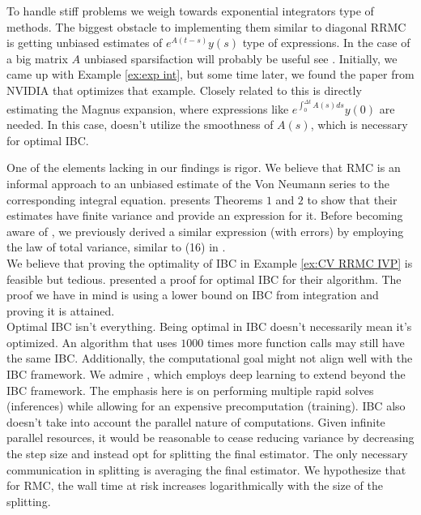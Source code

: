 \documentclass[a4paper,12pt]{article}
\begin{document}
To handle stiff problems we weigh towards exponential integrators
type of methods. The biggest obstacle to implementing them similar to diagonal RRMC
is getting unbiased estimates of $e^{A(t-s)} y(s)$ type of expressions. In the case
of a big matrix $A$  unbiased sparsifaction will probably be useful
see \cite{sabelfeld_sparsified_2009}.
Initially, we came up with Example \ref{ex:exp int}, but some time later,
we found the paper from NVIDIA \cite{kettunen_unbiased_2021} that optimizes
that example. Closely related to this is directly estimating the Magnus expansion,
where expressions like $e^{\int_{0}^{\Delta t} A(s)ds} y(0)$ are needed.
In this case, \cite{kettunen_unbiased_2021} doesn't utilize the smoothness of
$A(s)$, which is necessary
for optimal IBC.

One of the elements lacking in our findings is rigor.  We believe
that RMC is an informal approach to an unbiased estimate of
the Von Neumann series to the corresponding integral equation.
\cite{ermakov_monte_2021} presents Theorems $1$ and $2$ to
show that their estimates have finite variance and provide an expression for it.
Before becoming aware of \cite{ermakov_monte_2021}, we
previously derived a similar expression (with errors)
by employing the law of total variance, similar to (16) in \cite{rath_ears_2022}. \\
We believe that proving the optimality of IBC in Example \ref{ex:CV RRMC IVP} is feasible
but tedious.
\cite{daun_randomized_2011} presented a proof for optimal IBC for their algorithm.
The proof we have in mind is using a lower bound on IBC
from integration and proving it is attained.\\

Optimal IBC isn't everything. Being optimal in IBC doesn't necessarily mean it's optimized.
An algorithm that uses $1000$ times more function calls may still have the same
IBC. Additionally, the computational goal
might not align well with the IBC framework.
We admire \cite{becker_learning_2022},
which employs deep learning to extend beyond the IBC framework.
The emphasis here is on performing multiple rapid solves (inferences)
while allowing for an expensive precomputation (training).
IBC also doesn't take into account the parallel nature of computations.
Given infinite parallel resources, it would be reasonable to cease reducing
variance by decreasing the step size and instead opt for splitting the final estimator.
The only necessary communication in splitting is averaging the final
estimator. We hypothesize that for RMC, the wall time at risk
increases logarithmically with the size of the splitting.



\newpage
\begin{abstract}
    
\end{abstract}

\printbibliography
\newpage
\end{document}
